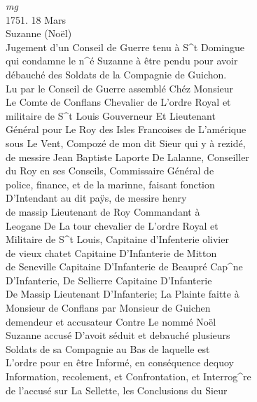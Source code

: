 \documentclass{article}
\begin{document}
\begin{pages}
\vspace{0.5cm}\noindent
\textit{mg}
\footnotesize \\
1751. 18 Mars\\
Suzanne (Noël)
\normalsize \pstart
\\
Jugement d'un Conseil de Guerre tenu à S\^{}t Domingue\\
qui condamne le n\^{}é Suzanne à être pendu pour avoir\\
débauché des Soldats de la Compagnie de Guichon.\\
Lu par le Conseil de Guerre assemblé Chéz Monsieur\\
Le Comte de Conflans Chevalier de L'ordre Royal et\\
militaire de S\^{}t Louis Gouverneur Et Lieutenant\\
Général pour Le Roy des Isles Francoises de L'amérique\\
sous Le Vent, Compozé de mon dit Sieur qui y à rezidé,\\
de messire Jean Baptiste Laporte De Lalanne, Conseiller\\
du Roy en ses Conseils, Commissaire Général de\\
police, finance, et de la marinne, faisant fonction\\
D'Intendant au dit paÿs, de messire henry\\
de massip Lieutenant de Roy Commandant à\\
Leogane De La tour chevalier de L'ordre Royal et\\
Militaire de S\^{}t Louis, Capitaine d'Infenterie olivier\\
de vieux chatet Capitaine D'Infanterie de Mitton\\
de Seneville Capitaine D'Infanterie de Beaupré Cap\^{}ne\\
D'Infanterie, De Sellierre Capitaine D'Infanterie\\
De Massip Lieutenant D'Infanterie; La Plainte faitte à\\
Monsieur de Conflans par Monsieur de Guichen\\
demendeur et accusateur Contre Le nommé Noël\\
Suzanne accusé D'avoit séduit et debauché plusieurs\\
Soldats de sa Compagnie au Bas de laquelle est\\
L'ordre pour en être Informé, en conséquence dequoy\\
Information, recolement, et Confrontation, et Interrog\^{}re\\
de l'accusé sur La Sellette, les Conclusions du Sieur\\

\end{pages}
\end{document}
